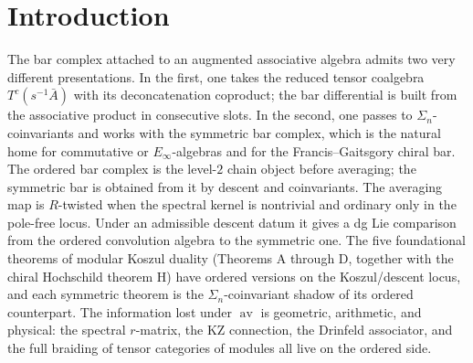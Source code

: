 \documentclass[11pt,reqno]{amsart}
\theoremstyle{definition}
\theoremstyle{remark}
\newcommand{\cA}{\mathcal{A}}
\newcommand{\SCchtop}{\mathsf{SC}^{\mathrm{ch,top}}}
\newcommand{\Barord}{\overline{B}^{\mathrm{ord}}}
\newcommand{\av}{\operatorname{av}}
\numberwithin{equation}{section}
\begin{document}
\begin{abstract}
The dimensional uplift from a $2$-real-dimensional chiral algebra
on a curve to a $3$-real-dimensional holomorphic--topological
theory is governed by the chiral Deligne--Tamarkin theorem
(Theorem~\ref{thm:swiss-cheese-chiral-DT-N3} below): the universal
local Swiss-cheese pair
$(Z^{\mathrm{der}}_{\mathrm{ch}}(\cA),\, \cA)$ is terminal in the
category of two-coloured $\SCchtop$-pairs over $\cA$, the open
colour $\cA$ is acted on by the closed colour through the chiral
Swiss-cheese mixed operations, and the closed sector is not acted
on by the open sector. The bar coalgebra $\Barord(\cA)$ is a
chain-level computational model that resolves $\cA$ for the purpose
of computing $Z^{\mathrm{der}}_{\mathrm{ch}}(\cA)$ via
$\mathrm{Hom}_{\mathrm{ch}}(\Barord(\cA),\, \cA)$; it does not by
itself supply the closed colour or the dimensional uplift.
\end{abstract}



\maketitle

\section{Introduction}
\label{sec:introduction}

The bar complex attached to an augmented associative algebra
admits two very different presentations. In the first, one takes
the reduced tensor coalgebra $T^{c}(s^{-1}\bar A)$ with its
deconcatenation coproduct; the bar differential is built from the
associative product in consecutive slots. In the second, one passes
to $\Sigma_{n}$-coinvariants and works with the symmetric bar
complex, which is the natural home for commutative or
$E_{\infty}$-algebras and for the Francis--Gaitsgory chiral bar.
The ordered bar complex is the level-$2$ chain object before
averaging; the symmetric bar is obtained from it by descent and coinvariants. The
averaging map is $R$-twisted when the spectral kernel is nontrivial
and ordinary only in the pole-free locus. Under an admissible
descent datum it gives a dg Lie comparison from the ordered
convolution algebra to the symmetric one. The five foundational
theorems of modular Koszul duality (Theorems A through D, together
with the chiral Hochschild theorem H) have ordered versions on the
Koszul/descent locus, and each symmetric theorem is the
$\Sigma_{n}$-coinvariant shadow of its ordered counterpart. The
information lost under $\av$ is geometric, arithmetic, and
physical: the spectral $r$-matrix, the KZ connection, the
Drinfeld associator, and the full braiding of tensor categories
of modules all live on the ordered side.
\end{document}
